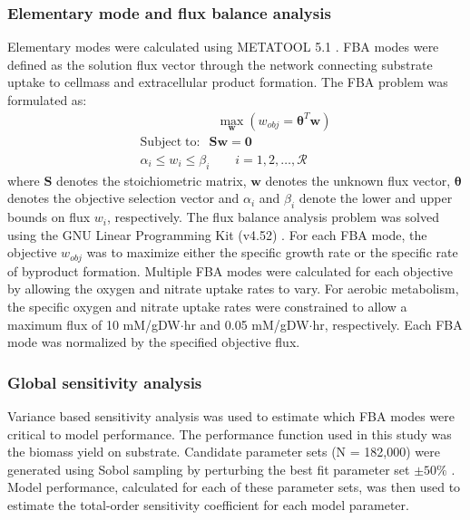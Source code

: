\documentclass[10pt,twocolumn,twoside,final]{IEEEtran}
\begin{document}
\noindent\subsubsection*{Elementary mode and flux balance analysis}
Elementary modes were calculated using METATOOL 5.1 \cite{2006_vonKamp_Metatool}.
FBA modes were defined as the solution flux vector through the network connecting substrate uptake to cellmass and extracellular product formation.
The FBA problem was formulated as:
\begin{equation}\nonumber
 \begin{multlined}
	\qquad \qquad \qquad \max_{\boldsymbol{w}}{} \! \left( w_{obj} = \mathbf{\boldsymbol{\theta}}^T \boldsymbol{w} \right) \\
	\mathrm{Subject \; to:}
	 \; \; \mathbf{S}\mathbf{w}=\mathbf{0} \\
\alpha_i \leq w_i \leq \beta_i  \qquad i=1,2,\hdots,\mathcal{R}
 \end{multlined}
\end{equation}
where $\mathbf{S}$ denotes the stoichiometric matrix, $\mathbf{w}$ denotes the unknown flux vector, $\boldsymbol{\theta}$ denotes the objective selection vector
and $\alpha_i$ and $\beta_i$ denote the lower and upper bounds on flux $w_{i}$, respectively.
The flux balance analysis problem was solved using the GNU Linear Programming Kit (v4.52) \cite{GLPK}.
For each FBA mode, the objective $w_{obj}$ was to maximize either the specific growth rate or the specific rate of byproduct formation.
Multiple FBA modes were calculated for each objective by allowing the oxygen and nitrate uptake rates to vary.
For aerobic metabolism, the specific oxygen and nitrate uptake rates were constrained to allow a maximum flux of 10 mM/gDW$\cdot$hr and 0.05 mM/gDW$\cdot$hr, respectively.
Each FBA mode was normalized by the specified objective flux.

\subsubsection*{Global sensitivity analysis}
Variance based sensitivity analysis was used to estimate which FBA modes were critical to model performance.
The performance function used in this study was the biomass yield on substrate.
Candidate parameter sets (N = 182,000) were generated using Sobol sampling by perturbing the best fit parameter set $\pm50\%$ \cite{SALib}.
Model performance, calculated for each of these parameter sets, was then used to estimate the total-order sensitivity coefficient for each model parameter.
\end{document}
